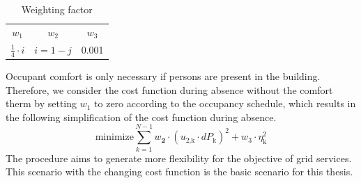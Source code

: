 \begin{table}[h]
    \centering
    \begin{tabular}{c|c|c}
         $w_\text{1}$ & $w_\text{2}$ & $w_\text{3}$ \\
        $\frac{1}{4} \cdot i$ & $i=1-j$ & 0.001
    \end{tabular}
    \caption{Weighting factor}
    \label{tab:weighting factor}
\end{table}
Occupant comfort is only necessary if persons are present in the building. Therefore, we consider the cost function during absence without the comfort therm by setting $w_\text{1}$ to zero according to the occupancy schedule, which results in the following simplification of the cost function during absence.
    \begin{equation}
        \text{minimize} \sum_{k=1}^{N-1} w_\textbf{2}\cdot(u_\text{2,k}\cdot dP_\text{k})^2 + w_\text{3} \cdot \eta_\text{k}^2
        \label{eq:costfunctionAbwesenheit}
    \end{equation}
The procedure aims to generate more flexibility for the objective of grid services. This scenario with the changing cost function is the basic scenario for this thesis.  %


